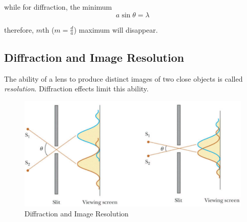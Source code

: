 \documentclass[openany]{book}
\begin{document}
while for diffraction, the minimum
\[a\sin \theta =\lambda \]

therefore, $m$th ($m=\frac{d}{a}$) maximum will disappear.

\subsection{Diffraction and Image Resolution}
The ability of a lens to produce distinct images of two close objects is called \emph{resolution}. Diffraction effects limit this ability.

\begin{figure}[H]
\centering
\label{fig:Diffraction and Image Resolution}
\includegraphics[scale=0.5]{Figure/28.PNG}
\caption{Diffraction and Image Resolution}
\end{figure}
\end{document}
